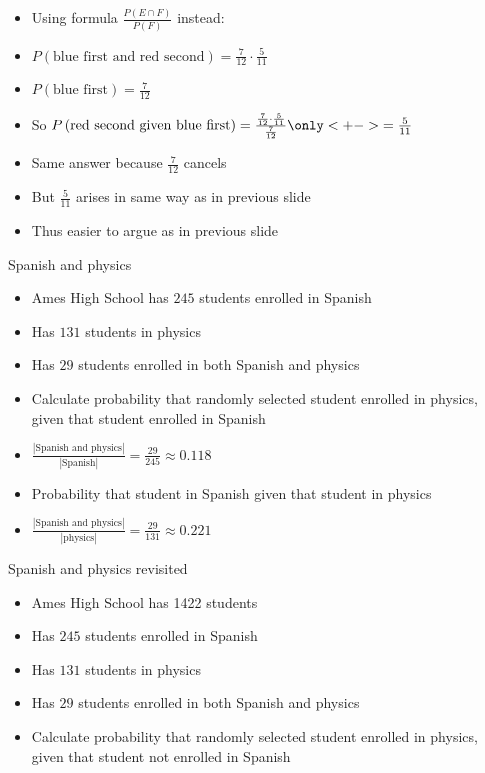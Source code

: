 \documentclass{beamer}
\theoremstyle{definition}
\begin{document}
\begin{frame}
\begin{itemize}
\item Using formula
$\frac{P\left(E\cap F\right)}{P\left(F\right)}$ instead:
\item $P\left(\text{blue first and red second}\right)
=\frac{7}{12}\cdot\frac{5}{11}$
\item $P\left(\text{blue first}\right)=\frac{7}{12}$
\item So $P\left(\text{red second given blue first}\right)
=\frac{\frac{7}{12}\cdot\frac{5}{11}}{\frac{7}{12}}
\only<+->{=\frac{5}{11}}$
\item Same answer because $\frac{7}{12}$ cancels
\item But $\frac{5}{11}$ arises in same way as in previous slide
\item Thus easier to argue as in previous slide
\end{itemize}
\end{frame}


\begin{frame}{Spanish and physics}
\begin{itemize}
\item Ames High School has $245$ students enrolled in Spanish
\item Has $131$ students in physics
\item Has $29$ students enrolled in both Spanish and physics
\item Calculate probability that randomly selected student
enrolled in physics, given that student enrolled in Spanish
\item $\frac{\left|\text{Spanish and physics}\right|}
{\left|\text{Spanish}\right|}
=\frac{29}{245}\approx 0.118$
\item Probability that student in Spanish given that student in physics
\item $\frac{\left|\text{Spanish and physics}\right|}
{\left|\text{physics}\right|}
=\frac{29}{131}\approx 0.221$
\end{itemize}
\end{frame}

\begin{frame}{Spanish and physics revisited}
\begin{itemize}
\item Ames High School has 1422 students
\item Has $245$ students enrolled in Spanish
\item Has $131$ students in physics
\item Has $29$ students enrolled in both Spanish and physics
\item Calculate probability that randomly selected student
enrolled in physics, given that student \alert{not} enrolled in Spanish
\end{itemize}
\end{frame}
\end{document}
